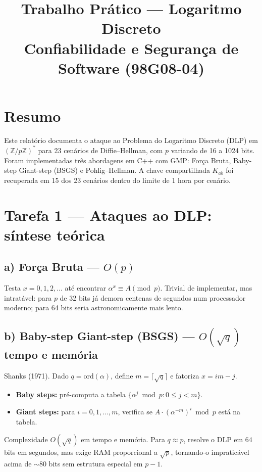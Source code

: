 \documentclass[conference, onecolumn]{IEEEtran}
\title{Trabalho Prático --- Logaritmo Discreto\\
\large Confiabilidade e Segurança de Software (98G08-04)}
\author{
    \IEEEauthorblockN{Bruno Becker Silva}
    \IEEEauthorblockA{Escola Politécnica, PUCRS \\ \texttt{bruno.becker@edu.pucrs.br}}
}
\begin{document}
\maketitle

\section*{Resumo}

Este relatório documenta o ataque ao Problema do Logaritmo Discreto (DLP) em $({\mathbb Z}/p{\mathbb Z})^*$
para 23 cenários de Diffie--Hellman, com $p$ variando de 16 a 1024 bits.
Foram implementadas três abordagens em C++ com GMP: Força Bruta, Baby-step Giant-step (BSGS)
e Pohlig--Hellman. A chave compartilhada $K_{ab}$ foi recuperada em 15 dos 23 cenários dentro
do limite de 1 hora por cenário.

\section{Tarefa 1 — Ataques ao DLP: síntese teórica}

\subsection{a) Força Bruta --- $O(p)$}

Testa $x = 0, 1, 2, \ldots$ até encontrar $\alpha^x \equiv A \pmod{p}$.
Trivial de implementar, mas intratável: para $p$ de 32 bits já demora centenas de segundos
num processador moderno; para 64 bits seria astronomicamente mais lento.

\subsection{b) Baby-step Giant-step (BSGS) --- $O(\sqrt{q})$ tempo e memória}

Shanks (1971). Dado $q = \mathrm{ord}(\alpha)$, define $m = \lceil\sqrt{q}\rceil$ e
fatoriza $x = im - j$.
\begin{itemize}
    \item \textbf{Baby steps:} pré-computa a tabela $\{\alpha^j \bmod p : 0 \le j < m\}$.
    \item \textbf{Giant steps:} para $i = 0, 1, \ldots, m$, verifica se
          $A \cdot (\alpha^{-m})^i \bmod p$ está na tabela.
\end{itemize}
Complexidade $O(\sqrt{q})$ em tempo e memória. Para $q \approx p$, resolve o DLP em 64 bits
em segundos, mas exige RAM proporcional a $\sqrt{p}$, tornando-o impraticável acima de
$\sim$80 bits sem estrutura especial em $p-1$.
\end{document}
